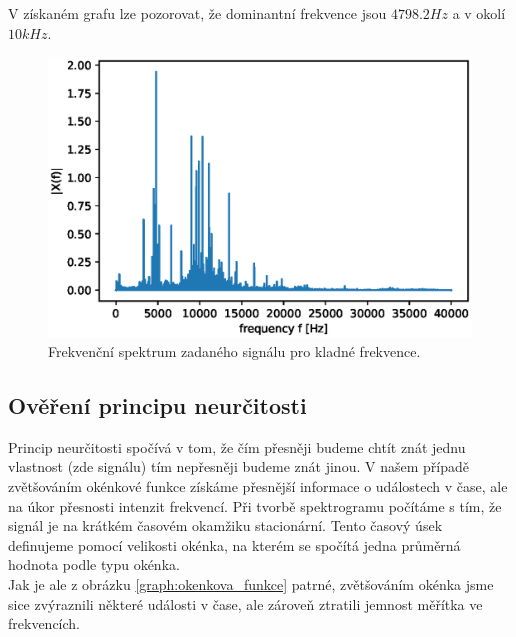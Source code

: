 \documentclass{article}
\begin{document}
			\noindent
			V získaném grafu lze pozorovat, že dominantní frekvence jsou \(4798.2Hz\) a v okolí \(10kHz\).
				\begin{figure}[H]
					\centering
					\includegraphics[width=\textwidth]{./Graphics/power_spectrum}
					\caption{Frekvenční spektrum zadaného signálu pro kladné frekvence.}
					\label{graph:spektrum_signalu}
				\end{figure}
		\subsection{Ověření principu neurčitosti}
			Princip neurčitosti spočívá v tom, že čím přesněji budeme chtít znát jednu vlastnost (zde signálu) tím nepřesněji budeme znát jinou. V našem případě zvětšováním okénkové funkce získáme přesnější informace o událostech v čase, ale na úkor přesnosti intenzit frekvencí. Při tvorbě spektrogramu počítáme s tím, že signál je na krátkém časovém okamžiku stacionární. Tento časový úsek definujeme pomocí velikosti okénka, na kterém se spočítá jedna průměrná hodnota podle typu okénka.\\
			
			\noindent
			Jak je ale z obrázku \ref{graph:okenkova_funkce} patrné, zvětšováním okénka jsme sice zvýraznili některé události v čase, ale zároveň ztratili jemnost měřítka ve frekvencích.\\
			
\end{document}
